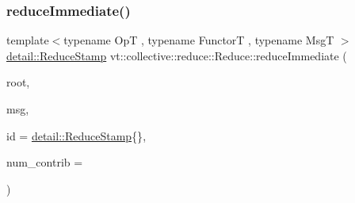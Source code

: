 \subsubsection{\texorpdfstring{reduce\+Immediate()}{reduceImmediate()}\hspace{0.1cm}{\footnotesize\ttfamily [7/8]}}
{\footnotesize\ttfamily template$<$typename OpT , typename FunctorT , typename MsgT $>$ \\
\hyperlink{namespacevt_1_1collective_1_1reduce_1_1detail_abcd205dec83706f347d55c7528bf2664}{detail\+::\+Reduce\+Stamp} vt\+::collective\+::reduce\+::\+Reduce\+::reduce\+Immediate (\begin{DoxyParamCaption}\item[{\hyperlink{namespacevt_a866da9d0efc19c0a1ce79e9e492f47e2}{Node\+Type} const \&}]{root,  }\item[{MsgT $\ast$}]{msg,  }\item[{\hyperlink{namespacevt_1_1collective_1_1reduce_1_1detail_abcd205dec83706f347d55c7528bf2664}{detail\+::\+Reduce\+Stamp}}]{id = {\ttfamily \hyperlink{namespacevt_1_1collective_1_1reduce_1_1detail_abcd205dec83706f347d55c7528bf2664}{detail\+::\+Reduce\+Stamp}\{\}},  }\item[{\hyperlink{structvt_1_1collective_1_1reduce_1_1_reduce_a6c3e63aca10c31d2823b0b18cf9762a4}{Reduce\+Num\+Type} const \&}]{num\+\_\+contrib = {} }\end{DoxyParamCaption})\hspace{0.3cm}{\ttfamily [inline]}}

\mbox{\label{structvt_1_1collective_1_1reduce_1_1_reduce_ad5b5b32dbde405974970f5bdbd24d5d9}} 
